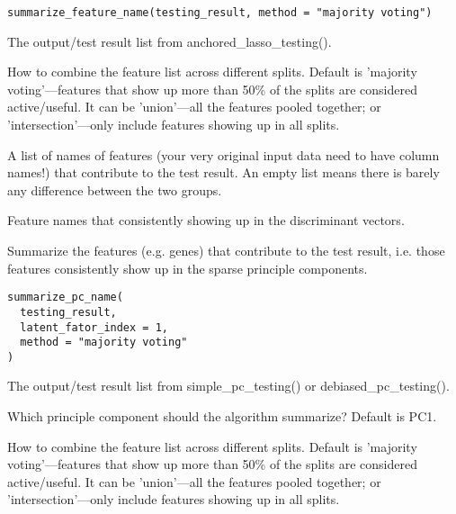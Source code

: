 \documentclass[a4paper]{book}
\begin{document}
%
\begin{Usage}
\begin{verbatim}
summarize_feature_name(testing_result, method = "majority voting")
\end{verbatim}
\end{Usage}
%
\begin{Arguments}
\begin{ldescription}
\item[\code{testing\_result}] The output/test result list from anchored\_lasso\_testing().

\item[\code{method}] How to combine the feature list across different splits. Default is 'majority voting'---features that show up more than 50\% of the splits are considered active/useful. It can be 'union'---all the features pooled together; or 'intersection'---only include features showing up in all splits.
\end{ldescription}
\end{Arguments}
%
\begin{Value}
A list of names of features (your very original input data need to have column names!) that contribute to the test result. An empty list means there is barely any difference between the two groups.

Feature names that consistently showing up in the discriminant vectors.
\end{Value}
%
\begin{Description}
Summarize the features (e.g. genes) that contribute to the test result, i.e. those features consistently show up in the sparse principle components.
\end{Description}
%
\begin{Usage}
\begin{verbatim}
summarize_pc_name(
  testing_result,
  latent_fator_index = 1,
  method = "majority voting"
)
\end{verbatim}
\end{Usage}
%
\begin{Arguments}
\begin{ldescription}
\item[\code{testing\_result}] The output/test result list from simple\_pc\_testing() or debiased\_pc\_testing().

\item[\code{latent\_fator\_index}] Which principle component should the algorithm summarize? Default is PC1.

\item[\code{method}] How to combine the feature list across different splits. Default is 'majority voting'---features that show up more than 50\% of the splits are considered active/useful. It can be 'union'---all the features pooled together; or 'intersection'---only include features showing up in all splits.
\end{ldescription}
\end{Arguments}
\end{document}
